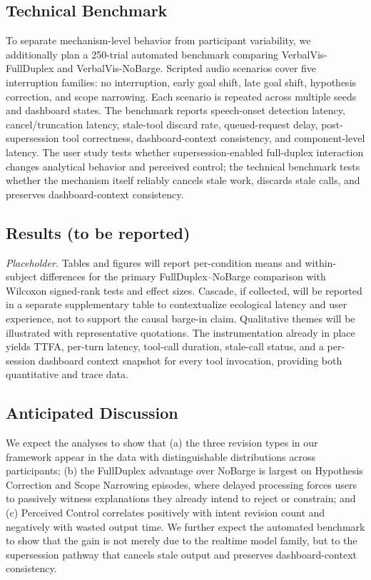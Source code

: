 \documentclass[journal]{IEEEtran}
\begin{document}
\subsection{Technical Benchmark}
To separate mechanism-level behavior from participant variability, we additionally plan a 250-trial automated benchmark comparing VerbalVis-FullDuplex and VerbalVis-NoBarge. Scripted audio scenarios cover five interruption families: no interruption, early goal shift, late goal shift, hypothesis correction, and scope narrowing. Each scenario is repeated across multiple seeds and dashboard states. The benchmark reports speech-onset detection latency, cancel/truncation latency, stale-tool discard rate, queued-request delay, post-supersession tool correctness, dashboard-context consistency, and component-level latency. The user study tests whether supersession-enabled full-duplex interaction changes analytical behavior and perceived control; the technical benchmark tests whether the mechanism itself reliably cancels stale work, discards stale calls, and preserves dashboard-context consistency.

\subsection{Results (to be reported)}
\emph{Placeholder.} Tables and figures will report per-condition means and within-subject differences for the primary FullDuplex--NoBarge comparison with Wilcoxon signed-rank tests and effect sizes. Cascade, if collected, will be reported in a separate supplementary table to contextualize ecological latency and user experience, not to support the causal barge-in claim. Qualitative themes will be illustrated with representative quotations. The instrumentation already in place yields TTFA, per-turn latency, tool-call duration, stale-call status, and a per-session dashboard context snapshot for every tool invocation, providing both quantitative and trace data.

\subsection{Anticipated Discussion}
We expect the analyses to show that (a) the three revision types in our framework appear in the data with distinguishable distributions across participants; (b) the FullDuplex advantage over NoBarge is largest on Hypothesis Correction and Scope Narrowing episodes, where delayed processing forces users to passively witness explanations they already intend to reject or constrain; and (c) Perceived Control correlates positively with intent revision count and negatively with wasted output time. We further expect the automated benchmark to show that the gain is not merely due to the realtime model family, but to the supersession pathway that cancels stale output and preserves dashboard-context consistency.
\end{document}
